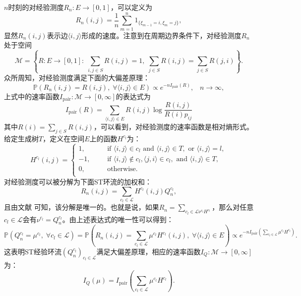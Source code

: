 $n$时刻的对经验测度$R_n:E\rightarrow[0,1]$，可以定义为
\begin{equation*}
R_n(i,j) = \frac{1}{n}\sum_{m=1}^n1_{\{\xi_{m-1}=i,\xi_m=j\}},
\end{equation*}
显然$R_n(i,j)$表示边$\langle i,j\rangle$形成的速度。注意到在周期边界条件下，对经验测度$R_n$处于空间
\begin{equation*}
\mathcal{M} = \left\{R:E\rightarrow[0,1]:\;\sum_{i,j\in S}R(i,j) = 1,\;
\sum_{j\in S}R(i,j)=\sum_{j\in S}R(j,i)\right\}.
\end{equation*}
众所周知，对经验测度满足下面的大偏差原理：
\begin{equation*}
\mathbb{P}(R_n(i,j)=R(i,j),\;\forall\langle i,j\rangle\in E)\propto e^{-nI_{\mathrm{pair}}(R)},\;\;\;n\to\infty,
\end{equation*}
上式中的速率函数$I_{\mathrm{pair}}:\mathcal{M}\rightarrow[0,\infty]$的表达式为
\begin{equation*}
I_{\mathrm{pair}}(R) = \sum_{\langle i,j\rangle\in E}R(i,j)\log\frac{R(i,j)}{R(i)p_{ij}}
\end{equation*}
其中$R(i)=\sum_{j\in S}R(i,j)$，可以看到，对经验测度的速率函数是相对熵形式。给定生成树$T$，定义在空间$E$上的函数$H^{c_l}$为：
\begin{equation*}\label{cycle function2}
H^{c_l}(i,j)
    =\left\{\begin{aligned}
    1, &   && \text{if } \langle i,j\rangle \in c_l \text{ and }\langle i,j\rangle \in T, \text{ or } \langle i,j\rangle=l,\\
    -1,&   && \text{if } \langle i,j\rangle\notin c_l,\langle j,i\rangle \in c_l,\text{ and }\langle i,j\rangle \in T,\\
    0, &   && \text{otherwise}.\\
    \end{aligned}\right.
\end{equation*}
对经验测度可以被分解为下面ST环流的加权和：
\begin{equation*}
R_n(i,j) = \sum_{c_l\in\mathcal{L}}H^{c_l}(i,j)Q^{c_l}_n,
\end{equation*}
且由文献 \cite{kalpazidou2007cycle}可知，该分解是唯一的。也就是说，如果$R_n =\sum_{c_l \in \mathcal{L}\nu^{c_l}H^{c_l}}$，那么对任意$c_l \in \mathcal{L}$会有$\nu^{c_l}=Q_n^{c_l}$。由上述表达式的唯一性可以得到：
\begin{equation*}
    \mathbb{P}(Q_n^{c_l}=\mu^{c_l},\;\forall c_l\in\mathcal{L})
    =\mathbb{P}\left(R_n(i,j)=\sum_{c_l\in\mathcal{L}}\mu^{c_l}H^{c_l}(i,j),\;\forall\langle i,j\rangle\in E\right)
    \propto e^{-n I_{\mathrm{pair}}\left(\sum_{c_l\in\mathcal{L}}\mu^{c_l}H^{c_l}\right)}.
\end{equation*}
这表明ST经验环流$(Q_n^{c_l})_{c_l\in\mathcal{L}}$满足大偏差原理，相应的速率函数$I_Q:\mathcal{M}\rightarrow[0,\infty]$为：
\begin{equation}\label{formula:I_Q}
I_Q(\mu)=I_{\mathrm{pair}}\left(\sum_{c_l\in\mathcal{L}}\mu^{c_l}H^{c_l}\right).
\end{equation}

